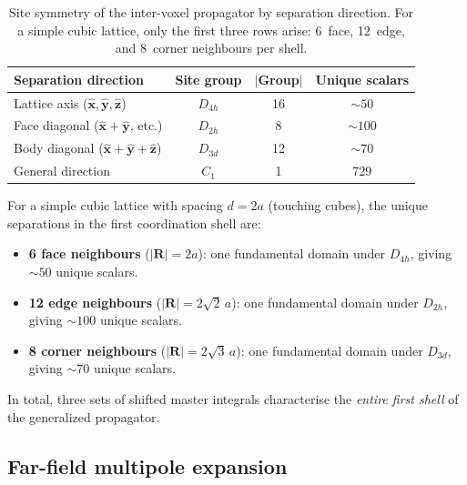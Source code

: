 \documentclass[11pt,a4paper]{article}
\newcommand{\bR}{\bm{R}}
\theoremstyle{plain}
\theoremstyle{definition}
\theoremstyle{remark}
\begin{document}
\begin{table}[ht]
\centering
\renewcommand{\arraystretch}{1.2}
\begin{tabular}{lccc}
\toprule
Separation direction & Site group & $|$Group$|$ & Unique scalars \\
\midrule
Lattice axis ($\hat{\bm{x}},\hat{\bm{y}},\hat{\bm{z}}$)
  & $D_{4h}$ & 16 & $\sim 50$ \\
Face diagonal ($\hat{\bm{x}} + \hat{\bm{y}}$, etc.)
  & $D_{2h}$ & 8 & $\sim 100$ \\
Body diagonal ($\hat{\bm{x}} + \hat{\bm{y}} + \hat{\bm{z}}$)
  & $D_{3d}$ & 12 & $\sim 70$ \\
General direction & $C_1$ & 1 & 729 \\
\bottomrule
\end{tabular}
\caption{Site symmetry of the inter-voxel propagator by separation
direction.  For a simple cubic lattice, only the first three rows
arise: 6~face, 12~edge, and 8~corner neighbours per shell.}
\label{tab:site-symmetry}
\end{table}

For a simple cubic lattice with spacing $d = 2a$ (touching cubes),
the unique separations in the first coordination shell are:
\begin{itemize}[nosep]
  \item \textbf{6 face neighbours} ($|\bR| = 2a$): one fundamental
    domain under $D_{4h}$, giving $\sim 50$ unique scalars.
  \item \textbf{12 edge neighbours} ($|\bR| = 2\sqrt{2}\,a$): one
    fundamental domain under $D_{2h}$, giving $\sim 100$ unique
    scalars.
  \item \textbf{8 corner neighbours} ($|\bR| = 2\sqrt{3}\,a$): one
    fundamental domain under $D_{3d}$, giving $\sim 70$ unique
    scalars.
\end{itemize}
In total, three sets of shifted master integrals characterise the
\emph{entire first shell} of the generalized propagator.


\subsection{Far-field multipole expansion}
\label{sec:far-field-prop}
\end{document}

